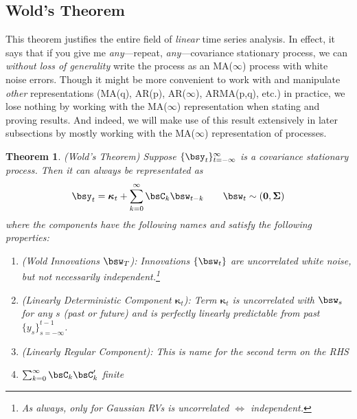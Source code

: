 \documentclass[12pt]{article}
\theoremstyle{plain}
\newtheorem{thm}{Theorem}[section]
\theoremstyle{definition}
\theoremstyle{remark}
\newcommand{\bsSigma}{\boldsymbol{\Sigma}}
\newcommand{\bskappa}{\boldsymbol{\kappa}}
\renewcommand{\bso}{\boldsymbol{0}}
\begin{document}
\clearpage
\subsection{Wold's Theorem}

This theorem justifies the entire field of \emph{linear} time series
analysis. In effect, it says that if you give me \emph{any}---repeat,
\emph{any}---covariance stationary process, we can
\emph{without loss of generality} write the process as an MA($\infty$)
process with white noise errors.
Though it might be more convenient to work with and
manipulate \emph{other} representations (MA(q), AR(p), AR($\infty$),
ARMA(p,q), etc.) in practice, we lose nothing by working with the
MA($\infty$) representation when stating and proving results. And
indeed, we will make use of this result extensively in later subsections
by mostly working with the MA($\infty$) representation of processes.


\begin{thm}\emph{(Wold's Theorem)}
Suppose $\{\bsy_t\}_{t=-\infty}^\infty$ is a covariance stationary process.
Then it can always be representated as
\begin{align*}
  \bsy_t = \bskappa_t + \sum_{k=0}^\infty \bsC_k \bsw_{t-k}
  \qquad \bsw_t\sim(\bso,\bsSigma)
\end{align*}
where the components have the following names and satisfy the following
properties:
\begin{enumerate}[label=\emph{(\roman*)}]
  \item \emph{(Wold Innovations $\bsw_T$):}
    Innovations $\{\bsw_t\}$ are uncorrelated white noise, but
    \emph{not} necessarily independent.\footnote{%
      As always, only for Gaussian RVs is uncorrelated $\iff$
      independent.
    }
  \item
    \emph{(Linearly Deterministic Component $\bskappa_t$)}:
    Term $\bskappa_t$ is uncorrelated with $\bsw_{s}$ for any $s$ (past
    or future) and is perfectly linearly predictable from past
    $\{y_s\}_{s=-\infty}^{t-1}$.
  \item \emph{(Linearly Regular Component):} This is name for the second
    term on the RHS
  \item $\sum_{k=0}^\infty \bsC_k\bsC_k'$ finite
\end{enumerate}
\end{thm}
\end{document}
